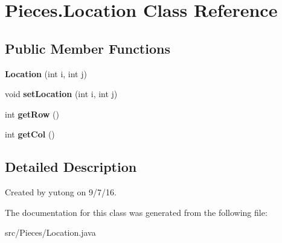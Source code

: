 \hypertarget{classMain_1_1Location}{\section{Pieces.\-Location Class Reference}
\label{classMain_1_1Location}
}
\subsection*{Public Member Functions}
\begin{DoxyCompactItemize}
\item 
\hypertarget{classMain_1_1Location_aded9d1f0310d37edb31bfbe774906637}{{\bfseries Location} (int i, int j)}\label{classMain_1_1Location_aded9d1f0310d37edb31bfbe774906637}

\item 
\hypertarget{classMain_1_1Location_af215a944421634d35339010283b9662d}{void {\bfseries set\-Location} (int i, int j)}\label{classMain_1_1Location_af215a944421634d35339010283b9662d}

\item 
\hypertarget{classMain_1_1Location_a19efcff81e904990d4b4cf1fe559db1c}{int {\bfseries get\-Row} ()}\label{classMain_1_1Location_a19efcff81e904990d4b4cf1fe559db1c}

\item 
\hypertarget{classMain_1_1Location_a682288b168c37e550d6fb459efd114cb}{int {\bfseries get\-Col} ()}\label{classMain_1_1Location_a682288b168c37e550d6fb459efd114cb}

\end{DoxyCompactItemize}


\subsection{Detailed Description}
Created by yutong on 9/7/16. 

The documentation for this class was generated from the following file\-:\begin{DoxyCompactItemize}
\item 
src/\-Pieces/Location.\-java\end{DoxyCompactItemize}
